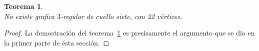 \documentclass[12pt]{book}
\newtheorem{theorem}{Teorema}
\theoremstyle{definition}
\begin{document}

\begin{theorem}\textbf{}\\
\label{Noexiste(3,7)de22}
No existe grafica $3$-regular de cuello siete, con 22 vértices.
\end{theorem}

\begin{proof} La demostración del teorema~\ref{Noexiste(3,7)de22} es
  presisamente el argumento que se dio en la primer parte de ésta
  sección.
\end{proof} 
\end{document}
